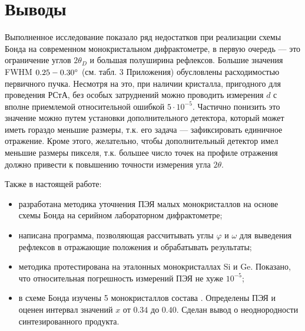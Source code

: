 \section{Выводы}

Выполненное исследование показало ряд недостатков при реализации схемы Бонда на современном монокристальном дифрактометре, в первую очередь --- это ограничение углов $2\theta_D$ и большая полуширина рефлексов.
Большие значения FWHM $0.25-0.30^\circ$ (см. табл. 3 Приложения) обусловлены расходимостью первичного пучка.
Несмотря на это, при наличии кристалла, пригодного для проведения РСтА, без особых затруднений можно проводить измерения $d$ с вполне приемлемой относительной ошибкой $5\cdot10^{-5}$.
Частично понизить это значение можно путем установки дополнительного детектора, который может иметь гораздо меньшие размеры, т.к. его задача --- зафиксировать единичное отражение.
Кроме этого, желательно, чтобы дополнительный детектор имел меньшие размеры пикселя, т.к. большее число точек на профиле отражения должно привести к повышению точности измерения угла $2\theta$.

Также в настоящей работе:
\begin{itemize}
    \item разработана методика уточнения ПЭЯ малых монокристаллов на основе схемы Бонда на серийном лабораторном дифрактометре;
    \item написана программа, позволяющая рассчитывать углы $\varphi$ и $\omega$ для выведения рефлексов в отражающие положения и обрабатывать результаты;
    \item методика протестирована на эталонных монокристаллах Si и Ge. Показано, что относительная погрешность измерений ПЭЯ не хуже $10^{-5}$;
    \item в схеме Бонда изучены 5 монокристаллов состава \YEu{}. Определены ПЭЯ и оценен интервал значений $x$ от $0.34$ до $0.40$. Сделан вывод о неоднородности синтезированного продукта.
\end{itemize}
